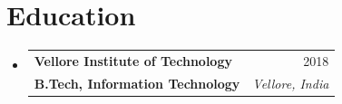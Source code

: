 \documentclass[letterpaper,10pt]{article}
\makeatletter
\newcommand{\resumeSubheading}[4]{
  \vspace{-1pt}\item
    \begin{tabular*}{0.99\textwidth}[t]{l@{\extracolsep{\fill}}r}
      \textbf{#1} & {\small #2} \\
      {\small\color{accent}\textbf{#3}} & \textit{\small #4} \\
    \end{tabular*}\vspace{-6pt}
}
\newcommand{\resumeSubHeadingListStart}{\begin{itemize}[leftmargin=0.15in, label={}]}
\newcommand{\resumeSubHeadingListEnd}{\end{itemize}}
\makeatother
\begin{document}
\section{Education}
  \resumeSubHeadingListStart
    \resumeSubheading
      {Vellore Institute of Technology}{2018}
      {B.Tech, Information Technology}{Vellore, India}
  \resumeSubHeadingListEnd
\end{document}
